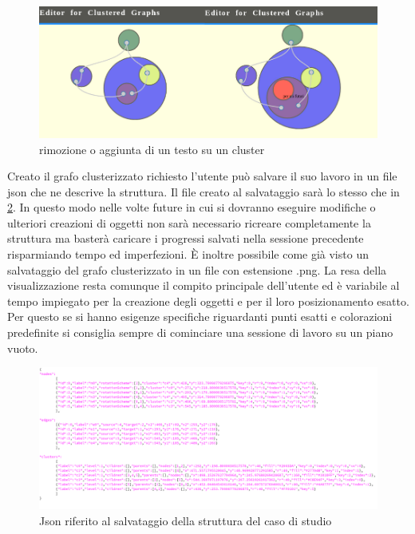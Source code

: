 \begin{figure}[!htb]
	\begin{center}
		\vspace{1cm}
		\includegraphics[width=1 \linewidth]{figure/deleteOrAddText}
	\end{center}
	\caption{rimozione o aggiunta di un testo su un cluster\label{fig:deleteOrAddText}}
\end{figure}
Creato il grafo clusterizzato richiesto l'utente può salvare il suo lavoro in un file json che ne descrive la struttura. Il file creato al salvataggio sarà lo stesso che in \figurename{\ref{fig:saveJson}}. In questo modo nelle volte future in cui si dovranno eseguire modifiche o ulteriori creazioni di oggetti non sarà necessario ricreare completamente la struttura ma basterà caricare i progressi salvati nella sessione precedente risparmiando tempo ed imperfezioni. È inoltre possibile come già visto un salvataggio del grafo clusterizzato in un file con estensione .png. La resa della visualizzazione resta comunque il compito principale dell'utente ed è variabile al tempo impiegato per la creazione degli oggetti e per il loro posizionamento esatto. Per questo se si hanno esigenze specifiche riguardanti punti esatti e colorazioni predefinite si consiglia sempre di cominciare una sessione di lavoro su un piano vuoto.
\begin{figure}[!htb]
	\begin{center}
		\vspace{1cm}
		\includegraphics[width=1.1 \linewidth]{figure/saveJson}
	\end{center}
	\caption{Json riferito al salvataggio della struttura del caso di studio\label{fig:saveJson}}
\end{figure}
\newpage

